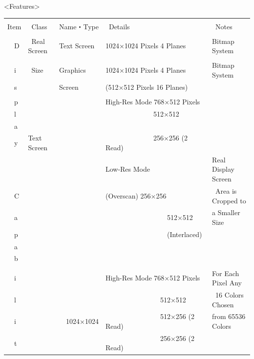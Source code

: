 \documentclass[twoside,a4paper,12pt]{article}
\begin{document}
\newpage

<Features>

\setlength{\tabcolsep}{0.5mm}
\begin{tabular}{|p{13mm}|p{23mm}|p{4mm}|p{20mm}|p{65mm}|p{36mm}|}
\hline
& & \multicolumn{2}{l|}{} & &\\[-2mm]
Item & \ Class & \multicolumn{2}{l|}{Name・Type} & \ Details & \ Notes\\[1mm]
\hline
& & \multicolumn{2}{l|}{} & &\\[-1mm]
\ \ D & \ Real Screen & \multicolumn{2}{l|}{Text Screen} & 1024×1024 Pixels 4 Planes & Bitmap System\\
\cline{3-6}
& & \multicolumn{2}{l|}{} & &\\[-4mm]
\ \ i & \ Size & \multicolumn{2}{l|}{Graphics} & 1024×1024 Pixels 4 Planes & Bitmap System\\
\ \ s & & \multicolumn{2}{l|}{Screen} & (512×512 Pixels 16 Planes) &\\
\cline{2-6}
& & \multicolumn{2}{l|}{} & &\\[-4mm]
\ \ p & & \multicolumn{2}{l|}{} & High-Res Mode 768×512 Pixels &\\
\ \ l & & \multicolumn{2}{l|}{} & \ \ \ \ \ \ \ \ \ \ \ \ \ \ 512×512 &\\
\ \ a & & \multicolumn{2}{l|}{} & &\\
\ \ y & Text Screen & \multicolumn{2}{l|}{} & \ \ \ \ \ \ \ \ \ \ \ \ \ \ 256×256 (2 Read) &\\
& & \multicolumn{2}{l|}{} & Low-Res Mode & Real Display Screen\\
\ \ C & & \multicolumn{2}{l|}{} & (Overscan) 256×256 & \ Area is Cropped to\\
\ \ a & & \multicolumn{2}{l|}{} & \ \ \ \ \ \ \ \ \ \ \ \ \ \ \ \ \ \ 512×512 & a Smaller Size\\
\ \ p & & \multicolumn{2}{l|}{} & \ \ \ \ \ \ \ \ \ \ \ \ \ \ \ \ \ \ (Interlaced) &\\
\ \ a & & \multicolumn{2}{l|}{} & &\\
\ \ b & & \multicolumn{2}{l|}{} & &\\
\cline{2-6}
& & & & &\\[-4mm]
\ \ i & & & & High-Res Mode 768×512 Pixels & For Each Pixel Any\\
\ \ l & & & & \ \ \ \ \ \ \ \ \ \ \ \ \ \ \ \ 512×512 & \ 16 Colors Chosen\\
\ \ i & & & 1024×1024 & \ \ \ \ \ \ \ \ \ \ \ \ \ \ \ \ 512×256 (2 Read) & from 65536 Colors\\
\ \ t & & & & \ \ \ \ \ \ \ \ \ \ \ \ \ \ \ \ 256×256 (2 Read) &\\

\end{tabular}
\end{document}
